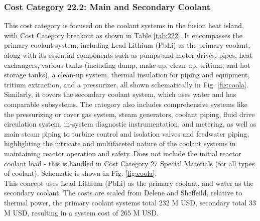 \subsubsection{Cost Category 22.2: Main and Secondary Coolant} 

This cost category is focused on the coolant systems in the fusion heat island, with Cost Category breakout as shown in Table \ref{tab:222}. It encompasses the primary coolant system, including Lead Lithium (PbLi) as the primary coolant, along with its essential components such as pumps and motor drives, pipes, heat exchangers, various tanks (including dump, make-up, clean-up, tritium, and hot storage tanks), a clean-up system, thermal insulation for piping and equipment, tritium extraction, and a pressurizer, all shown schematically in Fig. \ref{fig:coola}. Similarly, it covers the secondary coolant system, which uses water and has comparable subsystems.  The category also includes comprehensive systems like the pressurizing or cover gas system, steam generators, coolant piping, fluid drive circulation system, in-system diagnostic instrumentation, and metering, as well as main steam piping to turbine control and isolation valves and feedwater piping, highlighting the intricate and multifaceted nature of the coolant systems in maintaining reactor operation and safety.  Does not include the initial reactor coolant load - this is handled in  Cost Category 27 Special Materials (for all types of coolant). Schematic is shown in Fig. \ref{fig:coola}. \\




This concept uses Lead Lithium (PbLi) as the primary coolant, and water as the secondary coolant. The costs are scaled from Delene and Sheffeild, relative to thermal power, the primary coolant systems total 232 M USD, secondary total 33 M USD, resulting in a system cost of 265 M USD. \\


